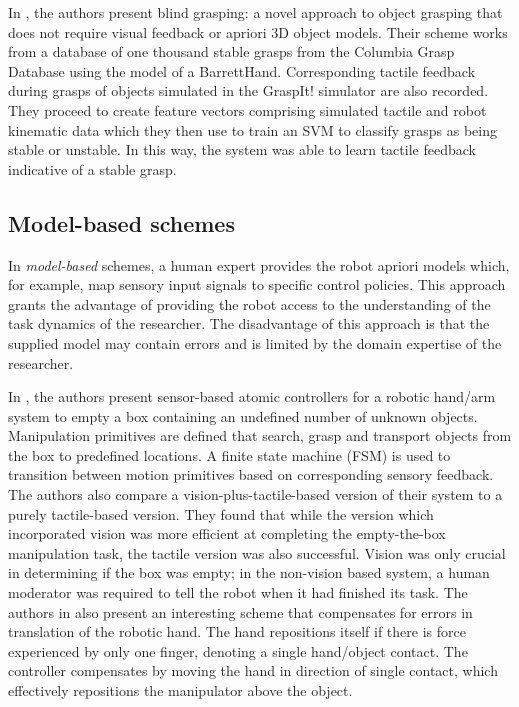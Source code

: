 In \cite{dang2011blind}, the authors present blind grasping: a novel approach to object grasping that does not require visual feedback or apriori 3D object models.
Their scheme works from a database of one thousand stable grasps from the Columbia Grasp Database using the model of a BarrettHand. 
Corresponding tactile feedback during grasps of objects simulated in the GraspIt! simulator are also recorded.
They proceed to create feature vectors comprising simulated tactile and robot kinematic data which they then use to train an SVM to classify grasps as being stable or unstable. 
In this way, the system was able to learn tactile feedback indicative of a stable grasp.

\subsection{Model-based schemes}

In \emph{model-based} schemes, a human expert provides the robot apriori models which, for example, map sensory input signals to specific control policies. 
This approach grants the advantage of providing the robot access to the understanding of the task dynamics of the researcher.
The disadvantage of this approach is that the supplied model may contain errors and is limited by the domain expertise of the researcher.

In \cite{felip2011emptying}, the authors present sensor-based atomic controllers for a robotic hand/arm system to empty a box containing an undefined number of unknown objects.
Manipulation primitives are defined that search, grasp and transport objects from the box to predefined locations.
A finite state machine (FSM) is used to transition between motion primitives based on corresponding sensory feedback.
The authors also compare a vision-plus-tactile-based version of their system to a purely tactile-based version.
They found that while the version which incorporated vision was more efficient at completing the empty-the-box manipulation task, the tactile version was also successful.
Vision was only crucial in determining if the box was empty; in the non-vision based system, a human moderator was required to tell the robot when it had finished its task.
The authors in \cite{felip2011emptying} also present an interesting scheme that compensates for errors in translation of the robotic hand.
The hand repositions itself if there is force experienced by only one finger, denoting a single hand/object contact.
The controller compensates by moving the hand in direction of single contact, which effectively repositions the manipulator above the object.

